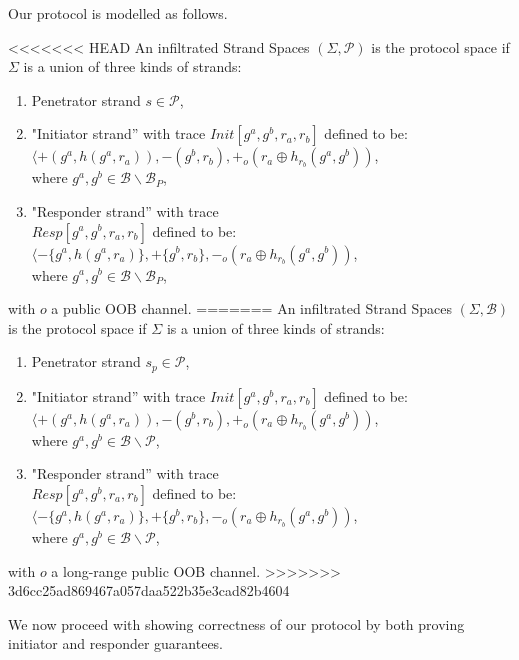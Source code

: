 \begin{itemize}
Our protocol is modelled as follows. 

\begin{Definition}
<<<<<<< HEAD
An infiltrated Strand Spaces $(\Sigma,\mathcal{P})$ is the protocol space if $\Sigma$ is a union of three kinds of strands:
\begin{enumerate}
\item Penetrator strand $s \in \mathcal{P}$,
\item "Initiator strand'' with trace {\small $Init[g^a,g^b,r_a,r_b]$} defined to be: \\ 
 {\small $\langle +(g^a,h(g^a,r_a)),-(g^b,r_b),+_o(r_a \oplus h_{r_b}(g^a,g^b))$, \\ where $g^a,g^b \in \mathcal{B} \backslash \mathcal{B}_{P}$,}
\item "Responder strand'' with trace\\
 {\small $Resp[g^a,g^b,r_a,r_b]$} defined to be: \\ 
 {\small $\langle -\{g^a,h(g^a,r_a)\},+\{g^b,r_b\}, -_o(r_a \oplus h_{r_b}(g^a,g^b))$, \\ where $g^a,g^b \in \mathcal{B} \backslash \mathcal{B}_{P}$,}
\end{enumerate}
with $o$ a public OOB channel.
=======
An infiltrated Strand Spaces $(\Sigma,\mathcal{B})$ is the protocol space if $\Sigma$ is a union of three kinds of strands:
\begin{enumerate}
\item Penetrator strand $s_p \in \mathcal{P}$,
\item "Initiator strand'' with trace {\small $Init[g^a,g^b,r_a,r_b]$} defined to be: \\ 
 {\small $\langle +(g^a,h(g^a,r_a)),-(g^b,r_b),+_o(r_a \oplus h_{r_b}(g^a,g^b))$, \\ where $g^a,g^b \in \mathcal{B} \backslash \mathcal{P}$,}
\item "Responder strand'' with trace\\
 {\small $Resp[g^a,g^b,r_a,r_b]$} defined to be: \\ 
 {\small $\langle -\{g^a,h(g^a,r_a)\},+\{g^b,r_b\}, -_o(r_a \oplus h_{r_b}(g^a,g^b))$, \\ where $g^a,g^b \in \mathcal{B} \backslash \mathcal{P}$,}
\end{enumerate}
with $o$ a long-range public OOB channel.
>>>>>>> 3d6cc25ad869467a057daa522b35e3cad82b4604
\end{Definition}

We now proceed with showing correctness of our protocol by both proving initiator and responder guarantees.


\end{itemize}
